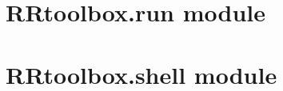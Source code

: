 \documentclass[letterpaper,10pt,english]{sphinxmanual}
\begin{document}

\begin{fulllineitems}
\label{RRtoolbox:RRtoolbox.core.tools}
\end{fulllineitems}


\begin{fulllineitems}
\label{RRtoolbox:RRtoolbox.core.tools2}
\end{fulllineitems}



\section{RRtoolbox.run module}
\label{RRtoolbox:module-RRtoolbox.run}\label{RRtoolbox:rrtoolbox-run-module}

\section{RRtoolbox.shell module}
\label{RRtoolbox:module-RRtoolbox.shell}\label{RRtoolbox:rrtoolbox-shell-module}
\end{document}
